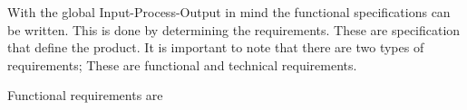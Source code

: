 With the global Input-Process-Output in mind the functional specifications can be written. This is done by determining the requirements. These are specification that define the product. It is important to note that there are two types of requirements; These are functional and  technical requirements.

Functional requirements are
